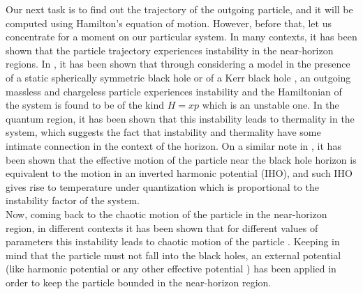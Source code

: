 \documentclass[aps,prd,showpacs,nofootinbib,floats,floatfix,preprintnumbers,groupedaddress,twocolumn]{revtex4-1}
\begin{document}
Our next task is to find out the trajectory of the outgoing particle, and it will be computed using Hamilton's equation of motion. However, before that, let us concentrate for a moment on our particular system. In many contexts, it has been shown that the particle trajectory experiences instability in the near-horizon regions. %
In \cite{Dalui:2019esx,Dalui:2020qpt,Dalui:2021tvy}, it has been shown that through considering a model  in the presence of a static spherically symmetric black hole \cite{Dalui:2019esx,Dalui:2020qpt} or of a Kerr black hole \cite{Dalui:2021tvy}, an outgoing massless and chargeless particle experiences instability and the Hamiltonian of the system is found to be of the kind $H= xp$  which is an unstable one. In the quantum region, it has been shown that this instability leads to thermality in the system, which suggests the fact that instability and thermality have some intimate connection in the context of the horizon. On a similar note in \cite{Hegde:2018xub},  it has been shown that the effective motion of the particle near the black hole horizon is equivalent to the motion in an inverted harmonic potential (IHO), and such IHO gives rise to temperature under quantization which is proportional to the instability factor of the system. \\
%
%
%
Now, coming back to the chaotic motion of the particle in the near-horizon region, in different contexts it has been shown that for different values of parameters  this instability leads to chaotic motion of the particle \cite{Dalui:2018qqv,Dalui:2019umw}. Keeping in mind that the particle must not fall into the black holes, an external potential (like harmonic potential \cite{Dalui:2018qqv} or any other effective potential \cite{Hashimoto:2016dfz}) has been applied in order to keep the particle bounded in the near-horizon region. \\
%
%
\end{document}
